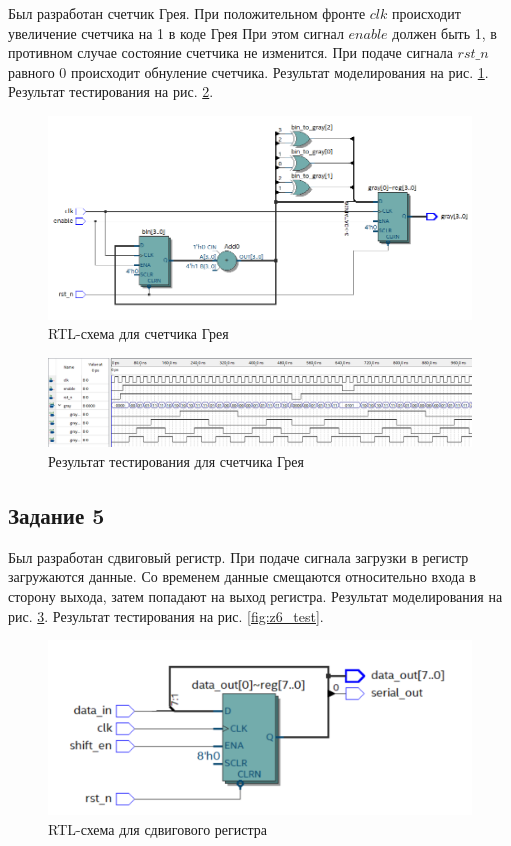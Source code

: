 \documentclass[a4paper,14pt]{article}
\begin{document}
	Был разработан счетчик Грея.
	При положительном фронте $clk$ происходит увеличение счетчика на 1 в коде Грея При этом сигнал $enable$ должен быть 1, в противном случае состояние счетчика не изменится. При подаче сигнала $rst\_n$ равного 0 происходит обнуление счетчика.
	Результат моделирования на рис. \ref{fig:z5_rtl}. Результат тестирования на рис. \ref{fig:z5_test}.
	
	\begin{figure}[H]
		\centering
		\includegraphics[width=\linewidth]{images/z5_rtl}
		\caption{RTL-схема для счетчика Грея}
		\label{fig:z5_rtl}
	\end{figure}
	
	\begin{figure}[H]
		\centering
		\includegraphics[width=\linewidth]{images/z5_test}
		\caption{Результат тестирования для счетчика Грея}
		\label{fig:z5_test}
	\end{figure}

	\subsection{Задание 5}
	
	Был разработан сдвиговый регистр.
	При подаче сигнала загрузки в регистр загружаются данные.
	Со временем данные смещаются относительно входа в сторону выхода, затем попадают на выход регистра.
	Результат моделирования на рис. \ref{fig:z6_rtl}. Результат тестирования на рис. \ref{fig:z6_test}.
	
	\begin{figure}[H]
		\centering
		\includegraphics[width=\linewidth]{images/z6_rtl}
		\caption{RTL-схема для сдвигового регистра}
		\label{fig:z6_rtl}
	\end{figure}
	
\end{document}
